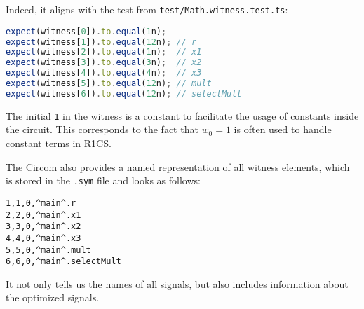 \documentclass[../lecture-notes-148x210.tex]{subfiles}
\begin{document}
Indeed, it aligns with the test from \texttt{test/Math.witness.test.ts}:

\begin{center}
    \begin{tcolorbox}[enhanced,
        width=0.75\textwidth,
        title={\textbf{test/Math.witness.test.ts}},
        coltitle=gray!25!black,
        attach boxed title to top center={yshift=-2mm,yshifttext=-1mm},
        boxed title style={size=small,colframe=gray!75!black,
        colback=Green!30!white,boxrule=1pt},
        top=-0.3cm,
        bottom=-0.3cm]
        \begin{lstlisting}[language=TypeScript,numbers=none,basicstyle=\ttfamily\footnotesize]
expect(witness[0]).to.equal(1n);
expect(witness[1]).to.equal(12n); // r
expect(witness[2]).to.equal(1n);  // x1
expect(witness[3]).to.equal(3n);  // x2
expect(witness[4]).to.equal(4n);  // x3
expect(witness[5]).to.equal(12n); // mult
expect(witness[6]).to.equal(12n); // selectMult
        \end{lstlisting}
    \end{tcolorbox}
\end{center}

The initial \texttt{1} in the witness is a constant to facilitate the usage of constants inside the circuit.
This corresponds to the fact that $w_0=1$ is often used to handle constant terms in R1CS.

The Circom also provides a named representation of all witness elements, which is stored in the \texttt{.sym} file and looks as follows:

\begin{center}
    \begin{tcolorbox}[enhanced,
        width=0.5\textwidth,
        title=\textbf{.sym file for $x_1? \; x_2 \times x_3: x_2+x_3$},
        coltitle=gray!25!black,
        attach boxed title to top center={yshift=-2mm,yshifttext=-1mm},
        boxed title style={size=small,colframe=gray!75!black,
        colback=blue!30!white,boxrule=1pt},
        top=-0.35cm,
        bottom=-0.35cm]
        \begin{lstlisting}[language=Circom,numbers=none,basicstyle=\ttfamily\footnotesize,escapechar=^]
1,1,0,^main^.r
2,2,0,^main^.x1
3,3,0,^main^.x2
4,4,0,^main^.x3
5,5,0,^main^.mult
6,6,0,^main^.selectMult
        \end{lstlisting}
    \end{tcolorbox}
\end{center}

It not only tells us the names of all signals, but also includes information about the optimized signals.
\end{document}
